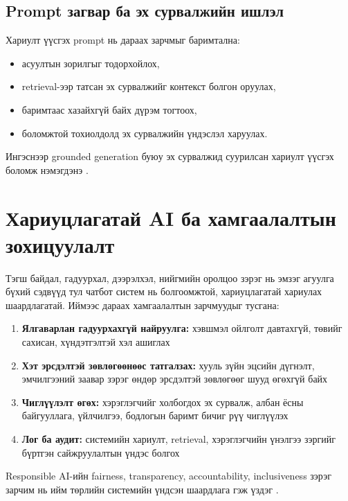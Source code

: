 \subsection{Prompt загвар ба эх сурвалжийн ишлэл}

Хариулт үүсгэх prompt нь дараах зарчмыг баримтална:
\begin{itemize}
    \item асуултын зорилгыг тодорхойлох,
    \item retrieval-ээр татсан эх сурвалжийг контекст болгон оруулах,
    \item баримтаас хазайхгүй байх дүрэм тогтоох,
    \item боломжтой тохиолдолд эх сурвалжийн үндэслэл харуулах.
\end{itemize}

Ингэснээр grounded generation буюу эх сурвалжид суурилсан хариулт үүсгэх боломж нэмэгдэнэ \cite{grounded_generation}.


\section{Хариуцлагатай AI ба хамгаалалтын зохицуулалт}

Тэгш байдал, гадуурхал, дээрэлхэл, нийгмийн оролцоо зэрэг нь эмзэг агуулга бүхий сэдвүүд тул чатбот систем нь болгоомжтой, хариуцлагатай хариулах шаардлагатай. Иймээс дараах хамгаалалтын зарчмуудыг тусгана:
\begin{enumerate}
    \item \textbf{Ялгаварлан гадуурхахгүй найруулга:} хэвшмэл ойлголт давтахгүй, төвийг сахисан, хүндэтгэлтэй хэл ашиглах
    \item \textbf{Хэт эрсдэлтэй зөвлөгөөнөөс татгалзах:} хууль зүйн эцсийн дүгнэлт, эмчилгээний заавар зэрэг өндөр эрсдэлтэй зөвлөгөөг шууд өгөхгүй байх
    \item \textbf{Чиглүүлэлт өгөх:} хэрэглэгчийг холбогдох эх сурвалж, албан ёсны байгууллага, үйлчилгээ, бодлогын баримт бичиг рүү чиглүүлэх
    \item \textbf{Лог ба аудит:} системийн хариулт, retrieval, хэрэглэгчийн үнэлгээ зэргийг бүртгэн сайжруулалтын үндэс болгох
\end{enumerate}

Responsible AI-ийн fairness, transparency, accountability, inclusiveness зэрэг зарчим нь ийм төрлийн системийн үндсэн шаардлага гэж үздэг \cite{responsible_ai}.

